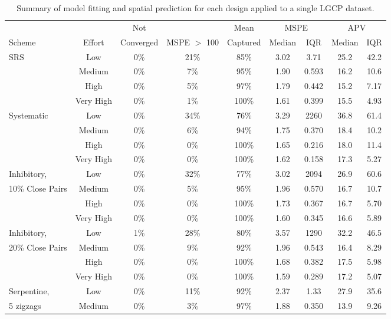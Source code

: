 \documentclass[review]{elsarticle}
\begin{document}
\begin{table}[h!]\tiny
\caption{Summary of model fitting and spatial prediction for each design
applied to a single LGCP dataset.}
\label{lgcptable}
\begin{tabular}{|l|c|c|c|c|cc|cc|}
\hline
& & Not & & Mean & \multicolumn{2}{|c|}{MSPE} & \multicolumn{2}{|c|}{APV} \\
Scheme & Effort & Converged & MSPE \(>\) 100 & Captured &
Median & IQR & Median & IQR \\
\hline
SRS &   Low & 0\% & 21\% &  85\% & 3.02 & 3.71  & 25.2 & 42.2  \\
&    Medium & 0\% &  7\% &  95\% & 1.90 & 0.593 & 16.2 & 10.6  \\
&      High & 0\% &  5\% &  97\% & 1.79 & 0.442 & 15.2 &  7.17 \\
& Very High & 0\% &  1\% & 100\% & 1.61 & 0.399 & 15.5 &  4.93 \\
\hline
Systematic & Low & 0\% & 34\% &  76\% & 3.29 & 2260  & 36.8 & 61.4 \\
&         Medium & 0\% &  6\% &  94\% & 1.75 & 0.370 & 18.4 & 10.2 \\
&           High & 0\% &  0\% & 100\% & 1.65 & 0.216 & 18.0 & 11.4 \\
&      Very High & 0\% &  0\% & 100\% & 1.62 & 0.158 & 17.3 &  5.27 \\
\hline
Inhibitory,      &    Low & 0\% & 32\% &  77\% & 3.02 & 2094  & 26.9 & 60.6  \\
10\% Close Pairs & Medium & 0\% &  5\% &  95\% & 1.96 & 0.570 & 16.7 & 10.7  \\
&                    High & 0\% &  0\% & 100\% & 1.73 & 0.367 & 16.7 &  5.70 \\
&               Very High & 0\% &  0\% & 100\% & 1.60 & 0.345 & 16.6 &  5.89 \\
\hline
Inhibitory,      &    Low & 1\% & 28\% &  80\% & 3.57 & 1290  & 32.2 & 46.5  \\
20\% Close Pairs & Medium & 0\% &  9\% &  92\% & 1.96 & 0.543 & 16.4 &  8.29 \\
&                    High & 0\% &  0\% & 100\% & 1.68 & 0.382 & 17.5 &  5.98 \\
&               Very High & 0\% &  0\% & 100\% & 1.59 & 0.289 & 17.2 &  5.07 \\
\hline
Serpentine, &  Low & 0\% & 11\% &  92\% & 2.37 & 1.33  & 27.9 & 35.6  \\
5 zigzags & Medium & 0\% &  3\% &  97\% & 1.88 & 0.350 & 13.9 &  9.26 \\

\end{tabular}
\end{table}
\end{document}
